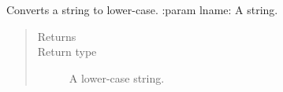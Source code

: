 \documentclass[letterpaper,10pt,english]{sphinxmanual}
\begin{document}

\begin{fulllineitems}
\label{\detokenize{index:ListManagement.utility.general.lower_head_values}}
Converts a string to lower-case.
:param lname: A string.
\begin{quote}\begin{description}
\item[{Returns}] \leavevmode


\item[{Return type}] \leavevmode
A lower-case string.

\end{description}\end{quote}

\end{fulllineitems}

\end{document}
